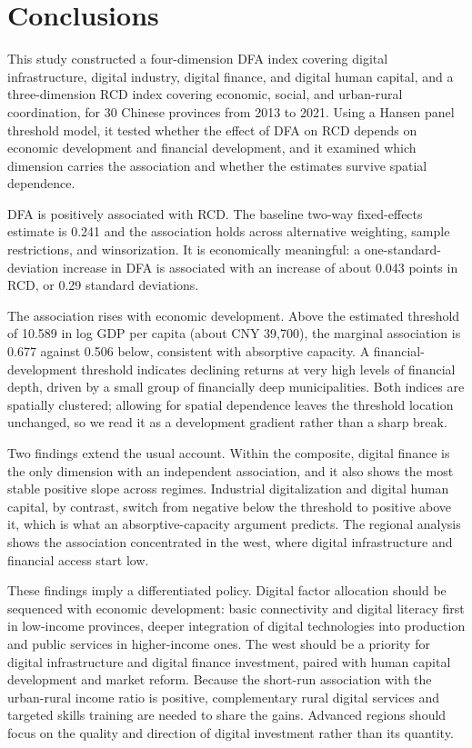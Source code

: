 \section{Conclusions}\label{sec:conclusion}

This study constructed a four-dimension DFA index covering digital infrastructure, digital industry, digital finance, and digital human capital, and a three-dimension RCD index covering economic, social, and urban-rural coordination, for 30 Chinese provinces from 2013 to 2021. Using a Hansen panel threshold model, it tested whether the effect of DFA on RCD depends on economic development and financial development, and it examined which dimension carries the association and whether the estimates survive spatial dependence.

DFA is positively associated with RCD. The baseline two-way fixed-effects estimate is 0.241 and the association holds across alternative weighting, sample restrictions, and winsorization. It is economically meaningful: a one-standard-deviation increase in DFA is associated with an increase of about 0.043 points in RCD, or 0.29 standard deviations.

The association rises with economic development. Above the estimated threshold of 10.589 in log GDP per capita (about CNY 39,700), the marginal association is 0.677 against 0.506 below, consistent with absorptive capacity. A financial-development threshold indicates declining returns at very high levels of financial depth, driven by a small group of financially deep municipalities. Both indices are spatially clustered; allowing for spatial dependence leaves the threshold location unchanged, so we read it as a development gradient rather than a sharp break.

Two findings extend the usual account. Within the composite, digital finance is the only dimension with an independent association, and it also shows the most stable positive slope across regimes. Industrial digitalization and digital human capital, by contrast, switch from negative below the threshold to positive above it, which is what an absorptive-capacity argument predicts. The regional analysis shows the association concentrated in the west, where digital infrastructure and financial access start low.

These findings imply a differentiated policy. Digital factor allocation should be sequenced with economic development: basic connectivity and digital literacy first in low-income provinces, deeper integration of digital technologies into production and public services in higher-income ones. The west should be a priority for digital infrastructure and digital finance investment, paired with human capital development and market reform. Because the short-run association with the urban-rural income ratio is positive, complementary rural digital services and targeted skills training are needed to share the gains. Advanced regions should focus on the quality and direction of digital investment rather than its quantity.

